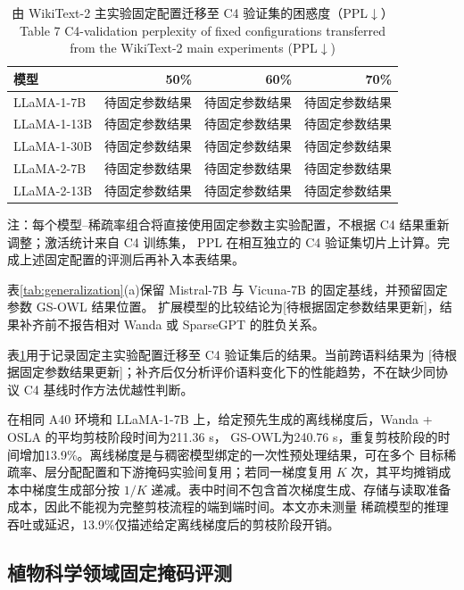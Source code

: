 \documentclass[UTF8,fontset=fandol]{ctexart}
\renewcommand{\arraystretch}{1.08}
\newcommand{\method}{GS-OWL}
\begin{document}
\begin{table}[!htbp]
\centering
\caption{由 WikiText-2 主实验固定配置迁移至 C4 验证集的困惑度（PPL$\downarrow$）\\
Table 7 C4-validation perplexity of fixed configurations transferred from the WikiText-2 main experiments (PPL$\downarrow$)}
\label{tab:c4_validation}
\scriptsize
\setlength{\tabcolsep}{7.0pt}
\renewcommand{\arraystretch}{0.98}
\begin{tabular}{lrrr}
\toprule
模型 & 50\% & 60\% & 70\% \\
\midrule
LLaMA-1-7B  & 待固定参数结果 & 待固定参数结果 & 待固定参数结果 \\
LLaMA-1-13B & 待固定参数结果 & 待固定参数结果 & 待固定参数结果 \\
LLaMA-1-30B & 待固定参数结果 & 待固定参数结果 & 待固定参数结果 \\
LLaMA-2-7B  & 待固定参数结果 & 待固定参数结果 & 待固定参数结果 \\
LLaMA-2-13B & 待固定参数结果 & 待固定参数结果 & 待固定参数结果 \\
\bottomrule
\end{tabular}
\vspace{2pt}
\parbox{0.88\textwidth}{\scriptsize
注：每个模型--稀疏率组合将直接使用固定参数主实验配置，不根据 C4 结果重新调整；激活统计来自 C4 训练集，
PPL 在相互独立的 C4 验证集切片上计算。完成上述固定配置的评测后再补入本表结果。}
\end{table}

表\ref{tab:generalization}(a)保留 Mistral-7B 与 Vicuna-7B 的固定基线，并预留固定参数 GS-OWL 结果位置。
扩展模型的比较结论为[待根据固定参数结果更新]，结果补齐前不报告相对 Wanda 或 SparseGPT 的胜负关系。

表\ref{tab:c4_validation}用于记录固定主实验配置迁移至 C4 验证集后的结果。当前跨语料结果为
[待根据固定参数结果更新]；补齐后仅分析评价语料变化下的性能趋势，不在缺少同协议 C4 基线时作方法优越性判断。

在相同 A40 环境和 LLaMA-1-7B 上，给定预先生成的离线梯度后，Wanda + OSLA 的平均剪枝阶段时间为211.36 s，
\method 为240.76 s，重复剪枝阶段的时间增加13.9\%。离线梯度是与稠密模型绑定的一次性预处理结果，可在多个
目标稀疏率、层分配配置和下游掩码实验间复用；若同一梯度复用 $K$ 次，其平均摊销成本中梯度生成部分按 $1/K$
递减。表中时间不包含首次梯度生成、存储与读取准备成本，因此不能视为完整剪枝流程的端到端时间。本文亦未测量
稀疏模型的推理吞吐或延迟，13.9\%仅描述给定离线梯度后的剪枝阶段开销。

\FloatBarrier
\subsection{植物科学领域固定掩码评测}
\end{document}
